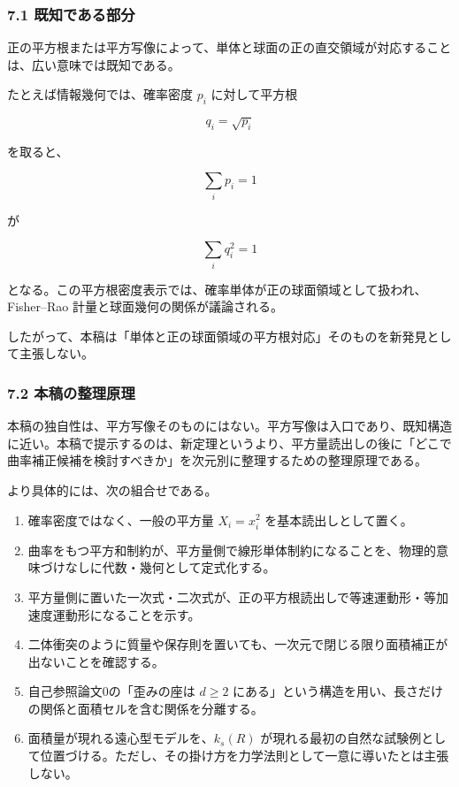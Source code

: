 \documentclass[
]{ltjsarticle}
\providecommand{\tightlist}{%
  \setlength{\itemsep}{0pt}\setlength{\parskip}{0pt}}
\begin{document}
\subsubsection{7.1
既知である部分}\label{ux65e2ux77e5ux3067ux3042ux308bux90e8ux5206}

正の平方根または平方写像によって、単体と球面の正の直交領域が対応することは、広い意味では既知である。

たとえば情報幾何では、確率密度 \(p_i\) に対して平方根

\[
q_i=\sqrt{p_i}
\]

を取ると、

\[
\sum_i p_i=1
\]

が

\[
\sum_i q_i^2=1
\]

となる。この平方根密度表示では、確率単体が正の球面領域として扱われ、Fisher--Rao
計量と球面幾何の関係が議論される。

したがって、本稿は「単体と正の球面領域の平方根対応」そのものを新発見として主張しない。

\subsubsection{7.2
本稿の整理原理}\label{ux672cux7a3fux306eux6574ux7406ux539fux7406}

本稿の独自性は、平方写像そのものにはない。平方写像は入口であり、既知構造に近い。本稿で提示するのは、新定理というより、平方量読出しの後に「どこで曲率補正候補を検討すべきか」を次元別に整理するための整理原理である。

より具体的には、次の組合せである。

\begin{enumerate}
\def\labelenumi{\arabic{enumi}.}
\tightlist
\item
  確率密度ではなく、一般の平方量 \(X_i=x_i^2\) を基本読出しとして置く。
\item
  曲率をもつ平方和制約が、平方量側で線形単体制約になることを、物理的意味づけなしに代数・幾何として定式化する。
\item
  平方量側に置いた一次式・二次式が、正の平方根読出しで等速運動形・等加速度運動形になることを示す。
\item
  二体衝突のように質量や保存則を置いても、一次元で閉じる限り面積補正が出ないことを確認する。
\item
  自己参照論文0の「歪みの座は \(d\ge2\)
  にある」という構造を用い、長さだけの関係と面積セルを含む関係を分離する。
\item
  面積量が現れる遠心型モデルを、\(k_s(R)\)
  が現れる最初の自然な試験例として位置づける。ただし、その掛け方を力学法則として一意に導いたとは主張しない。
\end{enumerate}
\end{document}
